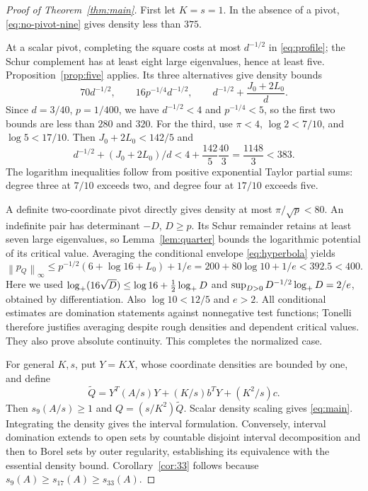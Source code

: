 \documentclass[11pt]{article}
\numberwithin{equation}{section}
\theoremstyle{definition}\newtheorem{definition}[theorem]{Definition}
\theoremstyle{remark}\newtheorem{remark}[theorem]{Remark}
\newcommand{\1}{\mathbf 1}\newcommand{\diag}{\operatorname{diag}}
\newcommand{\norm}[1]{\left\lVert#1\right\rVert}\newcommand{\abs}[1]{\left|#1\right|}
\begin{document}
\begin{proof}[Proof of Theorem~\ref{thm:main}]
First let $K=s=1$. In the absence of a pivot, \eqref{eq:no-pivot-nine} gives density less than $375$.

At a scalar pivot, completing the square costs at most $d^{-1/2}$ in \eqref{eq:profile}; the Schur complement has at least eight large eigenvalues, hence at least five. Proposition~\ref{prop:five} applies. Its three alternatives give density bounds
\begin{equation}\label{eq:scalar-branches}
 70d^{-1/2},\qquad 16p^{-1/4}d^{-1/2},\qquad
 d^{-1/2}+\frac{J_0+2L_0}{d}.
\end{equation}
Since $d=3/40$, $p=1/400$, we have $d^{-1/2}<4$ and $p^{-1/4}<5$, so the first two bounds are less than $280$ and $320$. For the third, use $\pi<4$, $\log2<7/10$, and $\log5<17/10$. Then $J_0+2L_0<142/5$ and
\[
 d^{-1/2}+(J_0+2L_0)/d<4+\frac{142}{5}\frac{40}{3}
 =\frac{1148}{3}<383.
\]
The logarithm inequalities follow from positive exponential Taylor partial sums: degree three at $7/10$ exceeds two, and degree four at $17/10$ exceeds five.

A definite two-coordinate pivot directly gives density at most $\pi/\sqrt p<80$. An indefinite pair has determinant $-D$, $D\ge p$. Its Schur remainder retains at least seven large eigenvalues, so Lemma~\ref{lem:quarter} bounds the logarithmic potential of its critical value. Averaging the conditional envelope \eqref{eq:hyperbola} yields
\[
 \norm{p_Q}_\infty
 \le p^{-1/2}(6+\log16+L_0)+1/e
 =200+80\log10+1/e<392.5<400.
\]
Here we used $\log_+(16\sqrt D)\le\log16+\tfrac12\log_+ D$ and
$\sup_{D>0}D^{-1/2}\log_+ D=2/e$, obtained by differentiation. Also $\log10<12/5$ and $e>2$. All conditional estimates are domination statements against nonnegative test functions; Tonelli therefore justifies averaging despite rough densities and dependent critical values. They also prove absolute continuity. This completes the normalized case.

For general $K,s$, put $Y=KX$, whose coordinate densities are bounded by one, and define
\[
 \widetilde Q=Y^T(A/s)Y+(K/s)b^TY+(K^2/s)c.
\]
Then $s_9(A/s)\ge1$ and $Q=(s/K^2)\widetilde Q$. Scalar density scaling gives \eqref{eq:main}. Integrating the density gives the interval formulation. Conversely, interval domination extends to open sets by countable disjoint interval decomposition and then to Borel sets by outer regularity, establishing its equivalence with the essential density bound. Corollary~\ref{cor:33} follows because $s_9(A)\ge s_{17}(A)\ge s_{33}(A)$.
\end{proof}
\end{document}
